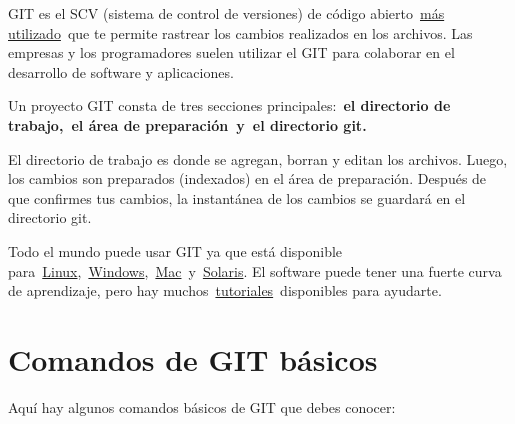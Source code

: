 \documentclass[
  a2paper,
]{article}
\begin{document}
GIT es el SCV (sistema de control de versiones) de código
abierto~\href{https://www.g2.com/categories/version-control-systems?utf8=\%E2\%9C\%93\&order=g2_score}{más
utilizado}~que te permite rastrear los cambios realizados en los
archivos. Las empresas y los programadores suelen utilizar el GIT para
colaborar en el desarrollo de software y aplicaciones.

Un proyecto GIT consta de tres secciones principales:~\textbf{el
directorio de trabajo,~el área de preparación~y~el directorio git.}

El directorio de trabajo es donde se agregan, borran y editan los
archivos. Luego, los cambios son preparados (indexados) en el área de
preparación. Después de que confirmes tus cambios, la instantánea de los
cambios se guardará en el directorio git.

Todo el mundo puede usar GIT ya que está disponible
para~\href{https://git-scm.com/book/es/v2}{Linux},~\href{https://gitforwindows.org/}{Windows},~\href{https://git-scm.com/download/mac}{Mac}~y~\href{https://www.opencsw.org/packages/git/}{Solaris}.
El software puede tener una fuerte curva de aprendizaje, pero hay
muchos~\href{https://www.hostinger.es/tutoriales/instalar-git-en-distintos-sistemas-operativos}{tutoriales}~disponibles
para ayudarte.

\hypertarget{comandos-de-git-buxe1sicos}{%
\section{Comandos de GIT básicos}\label{comandos-de-git-buxe1sicos}}

Aquí hay algunos comandos básicos de GIT que debes conocer:
\end{document}
